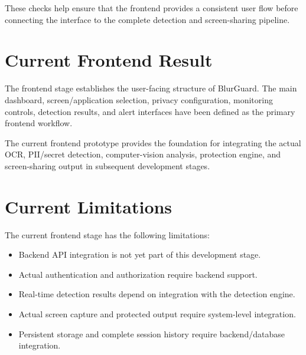 \documentclass[12pt,a4paper]{article}
\begin{document}
These checks help ensure that the frontend provides a consistent user flow before
connecting the interface to the complete detection and screen-sharing pipeline.


\section{Current Frontend Result}

The frontend stage establishes the user-facing structure of BlurGuard. The main dashboard,
screen/application selection, privacy configuration, monitoring controls, detection results,
and alert interfaces have been defined as the primary frontend workflow.

The current frontend prototype provides the foundation for integrating the actual OCR,
PII/secret detection, computer-vision analysis, protection engine, and screen-sharing
output in subsequent development stages.


\section{Current Limitations}

The current frontend stage has the following limitations:

\begin{itemize}

    \item Backend API integration is not yet part of this development stage.

    \item Actual authentication and authorization require backend support.

    \item Real-time detection results depend on integration with the detection engine.

    \item Actual screen capture and protected output require system-level integration.

    \item Persistent storage and complete session history require backend/database integration.

\end{itemize}
\end{document}
